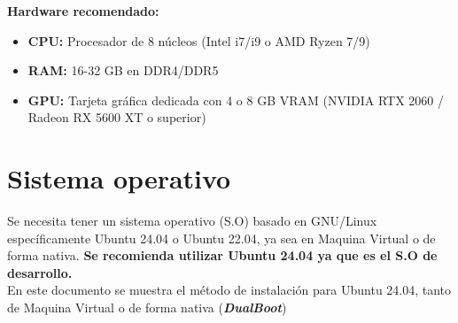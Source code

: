 \documentclass[letter,11pt]{article} %
\begin{document}
	\textbf{Hardware recomendado:}
	
	\begin{itemize}
		\item \textbf{CPU:} Procesador de 8 núcleos (Intel i7/i9 o AMD Ryzen 7/9)
		\item \textbf{RAM:} 16-32 GB en DDR4/DDR5
		\item \textbf{GPU:} Tarjeta gráfica dedicada con 4 o 8 GB VRAM (NVIDIA RTX 2060 / Radeon RX 5600 XT o superior)
	\end{itemize}
	
	\section{Sistema operativo}
	
	Se necesita tener un sistema operativo (S.O) basado en GNU/Linux específicamente Ubuntu 24.04 o Ubuntu 22.04, ya sea en Maquina Virtual o de forma nativa. \textbf{Se recomienda utilizar Ubuntu 24.04 ya que es el S.O de desarrollo.}\\
	
	
	En este documento se muestra el método de instalación para Ubuntu 24.04, tanto de Maquina Virtual o de forma nativa (\textbf{\textit{DualBoot}})
	
\end{document}
